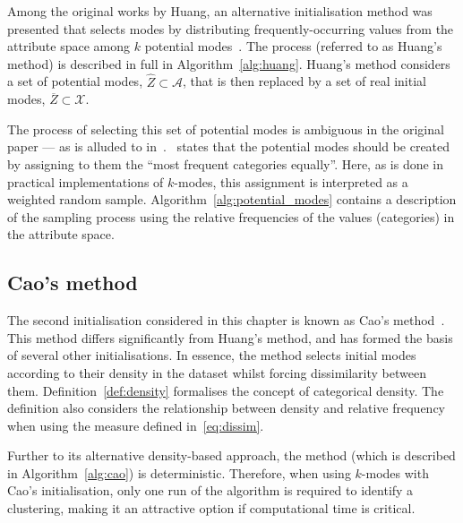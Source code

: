Among the original works by Huang, an alternative initialisation method was
presented that selects modes by distributing frequently-occurring values from
the attribute space among \(k\) potential modes~\cite{Huang1998}. The process
(referred to as Huang's method) is described in full in
Algorithm~\ref{alg:huang}. Huang's method considers a set of potential modes,
\(\widehat Z \subset \mathcal A\), that is then replaced by a set of real
initial modes, \(\overline Z \subset \mathcal X\).

The process of selecting this set of potential modes is ambiguous in the
original paper --- as is alluded to in~\cite{Jiang2016}.~\cite{Huang1998} states
that the potential modes should be created by assigning to them the ``most
frequent categories equally''. Here, as is done in practical implementations of
\(k\)-modes, this assignment is interpreted as a weighted random sample.
Algorithm~\ref{alg:potential_modes} contains a description of the sampling
process using the relative frequencies of the values (categories) in the
attribute space.



\subsection{Cao's method}\label{subsec:cao}

The second initialisation considered in this chapter is known as Cao's
method~\cite{Cao2009}. This method differs significantly from Huang's method,
and has formed the basis of several other initialisations. In essence, the
method selects initial modes according to their density in the dataset whilst
forcing dissimilarity between them. Definition~\ref{def:density} formalises the
concept of categorical density. The definition also considers the relationship
between density and relative frequency when using the measure defined
in~\eqref{eq:dissim}.

Further to its alternative density-based approach, the method (which is
described in Algorithm~\ref{alg:cao}) is deterministic. Therefore, when using
\(k\)-modes with Cao's initialisation, only one run of the algorithm is required
to identify a clustering, making it an attractive option if computational time
is critical.

